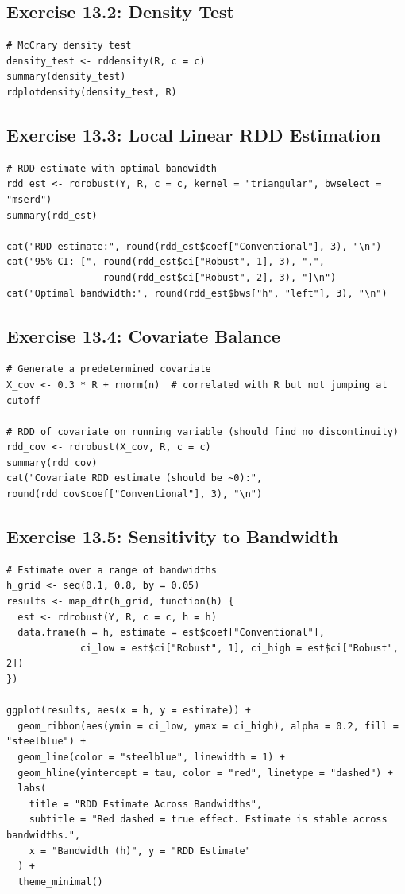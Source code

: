 \subsection{Exercise 13.2: Density Test}

\begin{lstlisting}
# McCrary density test
density_test <- rddensity(R, c = c)
summary(density_test)
rdplotdensity(density_test, R)
\end{lstlisting}

\subsection{Exercise 13.3: Local Linear RDD Estimation}

\begin{lstlisting}
# RDD estimate with optimal bandwidth
rdd_est <- rdrobust(Y, R, c = c, kernel = "triangular", bwselect = "mserd")
summary(rdd_est)

cat("RDD estimate:", round(rdd_est$coef["Conventional"], 3), "\n")
cat("95% CI: [", round(rdd_est$ci["Robust", 1], 3), ",",
                 round(rdd_est$ci["Robust", 2], 3), "]\n")
cat("Optimal bandwidth:", round(rdd_est$bws["h", "left"], 3), "\n")
\end{lstlisting}

\subsection{Exercise 13.4: Covariate Balance}

\begin{lstlisting}
# Generate a predetermined covariate
X_cov <- 0.3 * R + rnorm(n)  # correlated with R but not jumping at cutoff

# RDD of covariate on running variable (should find no discontinuity)
rdd_cov <- rdrobust(X_cov, R, c = c)
summary(rdd_cov)
cat("Covariate RDD estimate (should be ~0):", round(rdd_cov$coef["Conventional"], 3), "\n")
\end{lstlisting}

\subsection{Exercise 13.5: Sensitivity to Bandwidth}

\begin{lstlisting}
# Estimate over a range of bandwidths
h_grid <- seq(0.1, 0.8, by = 0.05)
results <- map_dfr(h_grid, function(h) {
  est <- rdrobust(Y, R, c = c, h = h)
  data.frame(h = h, estimate = est$coef["Conventional"],
             ci_low = est$ci["Robust", 1], ci_high = est$ci["Robust", 2])
})

ggplot(results, aes(x = h, y = estimate)) +
  geom_ribbon(aes(ymin = ci_low, ymax = ci_high), alpha = 0.2, fill = "steelblue") +
  geom_line(color = "steelblue", linewidth = 1) +
  geom_hline(yintercept = tau, color = "red", linetype = "dashed") +
  labs(
    title = "RDD Estimate Across Bandwidths",
    subtitle = "Red dashed = true effect. Estimate is stable across bandwidths.",
    x = "Bandwidth (h)", y = "RDD Estimate"
  ) +
  theme_minimal()
\end{lstlisting}

